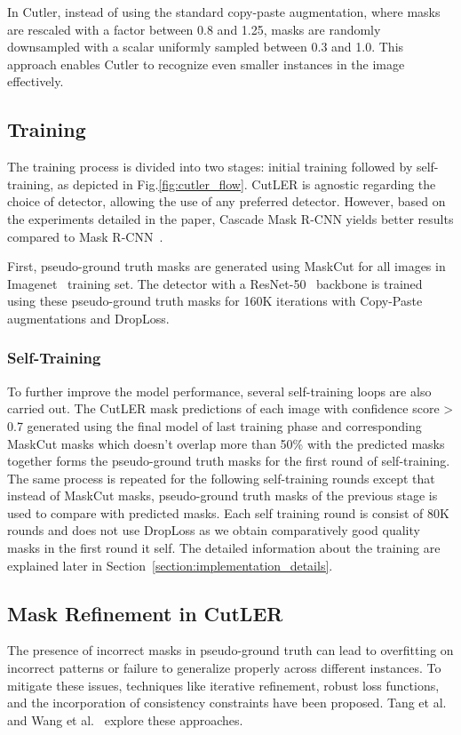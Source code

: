 In Cutler, instead of using the standard copy-paste augmentation, where masks are rescaled with a factor between 0.8 and 1.25, masks are randomly downsampled with a scalar uniformly sampled between 0.3 and 1.0. This approach enables Cutler to recognize even smaller instances in the image effectively.

\subsection{Training}
The training process is divided into two stages: initial training followed by self-training, as depicted in Fig.\ref{fig:cutler_flow}. CutLER is agnostic regarding the choice of detector, allowing the use of any preferred detector. However, based on the experiments detailed in the paper, Cascade Mask R-CNN\cite{cai2019cascadercnnhighquality} yields better results compared to Mask R-CNN~\cite{he2018maskrcnn}.

First, pseudo-ground truth masks are generated using MaskCut for all images in Imagenet~\cite{deng2009imagenet} training set. The detector with a ResNet-50~\cite{he2015deepresiduallearningimage} backbone is trained using these pseudo-ground truth masks for 160K iterations with Copy-Paste augmentations and DropLoss.

\subsubsection{Self-Training}
To further improve the model performance, several self-training loops are also carried out. The CutLER mask predictions of each image with confidence score > 0.7 generated using the final model of last training phase and corresponding MaskCut masks which doesn't overlap more than 50\% with the predicted masks together forms the pseudo-ground truth masks for the first round of self-training. The same process is repeated for the following self-training rounds except that instead of MaskCut masks, pseudo-ground truth masks of the previous stage is used to compare with predicted masks. Each self training round is consist of 80K rounds and does not use DropLoss as we obtain comparatively good quality masks in the first round it self. The detailed information about the training are explained later in Section~\ref{section:implementation_details}.

\subsection{Mask Refinement in CutLER}
The presence of incorrect masks in pseudo-ground truth can lead to overfitting on incorrect patterns or failure to generalize properly across different instances. To mitigate these issues, techniques like iterative refinement, robust loss functions, and the incorporation of consistency constraints have been proposed. Tang et al.~\cite{Tang_2018_CVPR} and Wang et al.~\cite{ziegler2022selfsupervisedlearningobjectparts} explore these approaches. 


